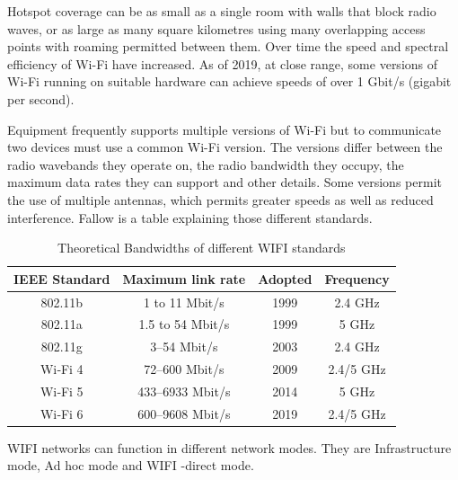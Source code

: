 \vspace{12pt}

Hotspot coverage can be as small as a single room with walls that block radio waves, or as large as many square kilometres using many overlapping access points with roaming permitted between them. Over time the speed and spectral efficiency of Wi-Fi have increased. As of 2019, at close range, some versions of Wi-Fi running on suitable hardware can achieve speeds of over 1 Gbit/s (gigabit per second).


\vspace{12pt}

Equipment frequently supports multiple versions of Wi-Fi but to communicate two devices must use a common Wi-Fi version. The versions differ between the radio wavebands they operate on, the radio bandwidth they occupy, the maximum data rates they can support and other details. Some versions permit the use of multiple antennas, which permits greater speeds as well as reduced interference. Fallow is a table explaining those different standards.

\vspace{12pt}

\begin{table}
\centering
\begin{tabular}{| c | c | c | c |}
\hline
IEEE Standard & Maximum link rate & Adopted & Frequency \\
\hline
 802.11b & 1 to 11 Mbit/s & 1999 & 2.4 GHz\\ 
 \hline 
 802.11a & 1.5 to 54 Mbit/s & 1999 & 5 GHz\\
 \hline   
  802.11g & 3–54 Mbit/s & 2003 & 2.4 GHz\\
 \hline
  Wi‑Fi 4 & 72–600 Mbit/s & 2009  &	2.4/5 GHz \\
 \hline
  Wi‑Fi 5 & 433–6933 Mbit/s & 2014 & 	5 GHz \\
 \hline
  Wi‑Fi 6 & 600–9608 Mbit/s & 2019	& 2.4/5 GHz \\
 \hline  
\end{tabular}
\caption{Theoretical Bandwidths of different  WIFI  standards}
\label{table1}

\end{table}



\vspace{12pt}

 WIFI  networks can function in different network modes. They are Infrastructure mode, Ad hoc mode and  WIFI  -direct mode.

